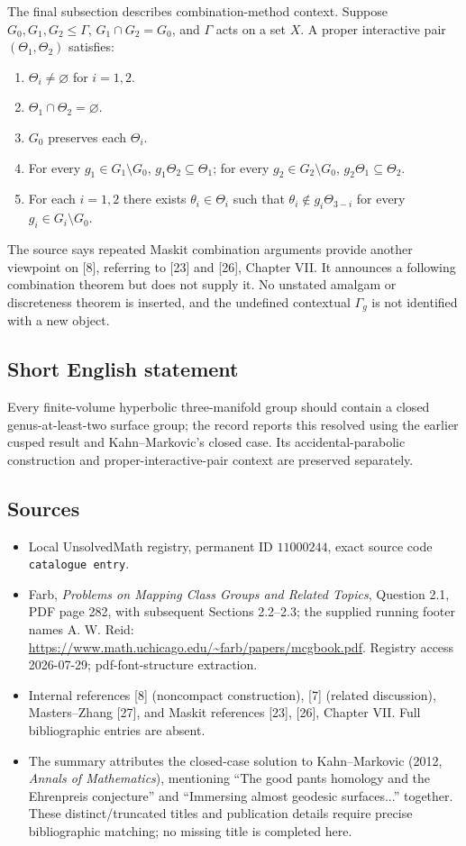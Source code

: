 \documentclass[11pt]{article}
\begin{document}
The final subsection describes combination-method context. Suppose \(G_0,G_1,G_2\leq\Gamma\), \(G_1\cap G_2=G_0\), and \(\Gamma\) acts on a set \(X\). A proper interactive pair \((\Theta_1,\Theta_2)\) satisfies:
\begin{enumerate}
\item \(\Theta_i\ne\varnothing\) for \(i=1,2\).
\item \(\Theta_1\cap\Theta_2=\varnothing\).
\item \(G_0\) preserves each \(\Theta_i\).
\item For every \(g_1\in G_1\setminus G_0\), \(g_1\Theta_2\subseteq\Theta_1\); for every \(g_2\in G_2\setminus G_0\), \(g_2\Theta_1\subseteq\Theta_2\).
\item For each \(i=1,2\) there exists \(\theta_i\in\Theta_i\) such that \(\theta_i\notin g_i\Theta_{3-i}\) for every \(g_i\in G_i\setminus G_0\).
\end{enumerate}
The source says repeated Maskit combination arguments provide another viewpoint on [8], referring to [23] and [26], Chapter VII. It announces a following combination theorem but does not supply it. No unstated amalgam or discreteness theorem is inserted, and the undefined contextual \(\Gamma_g\) is not identified with a new object.
\subsection{Short English statement}
Every finite-volume hyperbolic three-manifold group should contain a closed genus-at-least-two surface group; the record reports this resolved using the earlier cusped result and Kahn--Markovic's closed case. Its accidental-parabolic construction and proper-interactive-pair context are preserved separately.
\subsection{Sources}
\begin{itemize}
\item Local UnsolvedMath registry, permanent ID \(11000244\), exact source code \texttt{catalogue entry}.
\item Farb, \emph{Problems on Mapping Class Groups and Related Topics}, Question 2.1, PDF page 282, with subsequent Sections 2.2--2.3; the supplied running footer names A. W. Reid: \url{https://www.math.uchicago.edu/~farb/papers/mcgbook.pdf}. Registry access 2026-07-29; pdf-font-structure extraction.
\item Internal references [8] (noncompact construction), [7] (related discussion), Masters--Zhang [27], and Maskit references [23], [26], Chapter VII. Full bibliographic entries are absent.
\item The summary attributes the closed-case solution to Kahn--Markovic (2012, \emph{Annals of Mathematics}), mentioning ``The good pants homology and the Ehrenpreis conjecture'' and ``Immersing almost geodesic surfaces...'' together. These distinct/truncated titles and publication details require precise bibliographic matching; no missing title is completed here.
\end{itemize}
\end{document}
